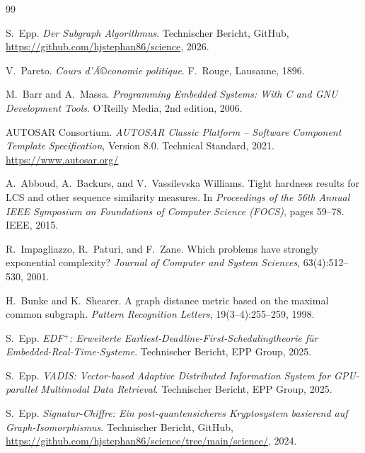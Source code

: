 ﻿\documentclass[a4paper,12pt]{article}
\theoremstyle{definition}
\begin{document}
\newpage

\begin{thebibliography}{99}

S.\ Epp.
\newblock \emph{Der Subgraph Algorithmus}.
\newblock Technischer Bericht, GitHub,
  \url{https://github.com/hjstephan86/science}, 2026.

V.\ Pareto.
\newblock \emph{Cours d'Ã©conomie politique}.
\newblock F.\ Rouge, Lausanne, 1896.

M.\ Barr and A.\ Massa.
\newblock \emph{Programming Embedded Systems: With C and GNU Development Tools}.
\newblock O'Reilly Media, 2nd edition, 2006.

AUTOSAR Consortium.
\newblock \emph{AUTOSAR Classic Platform -- Software Component Template
  Specification}, Version 8.0.
\newblock Technical Standard, 2021.
  \url{https://www.autosar.org/}

A.\ Abboud, A.\ Backurs, and V.\ Vassilevska Williams.
\newblock Tight hardness results for {LCS} and other sequence similarity measures.
\newblock In \emph{Proceedings of the 56th Annual IEEE Symposium on Foundations
  of Computer Science (FOCS)}, pages 59--78. IEEE, 2015.

R.\ Impagliazzo, R.\ Paturi, and F.\ Zane.
\newblock Which problems have strongly exponential complexity?
\newblock \emph{Journal of Computer and System Sciences}, 63(4):512--530, 2001.

H.\ Bunke and K.\ Shearer.
\newblock A graph distance metric based on the maximal common subgraph.
\newblock \emph{Pattern Recognition Letters}, 19(3--4):255--259, 1998.

S.\ Epp.
\newblock \emph{EDF$^+$: Erweiterte Earliest-Deadline-First-Schedulingtheorie
  f\"{u}r Embedded-Real-Time-Systeme}.
\newblock Technischer Bericht, EPP Group, 2025.

S.\ Epp.
\newblock \emph{VADIS: Vector-based Adaptive Distributed Information System
  for GPU-parallel Multimodal Data Retrieval}.
\newblock Technischer Bericht, EPP Group, 2025.

S.\ Epp.
\newblock \emph{Signatur-Chiffre: Ein post-quantensicheres Kryptosystem
  basierend auf Graph-Isomorphismus}.
\newblock Technischer Bericht, GitHub,
  \url{https://github.com/hjstephan86/science/tree/main/science/}, 2024.


\end{thebibliography}
\end{document}
